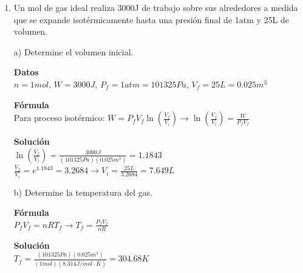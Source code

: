 \documentclass[a4paper, 11pt]{article}
\newcommand{\Pspace}{0.5cm}
\newcommand{\Aspace}{0.2cm}
\begin{document}
\begin{enumerate}
    \vspace{\Pspace}
    \item Un mol de gas ideal realiza 3000J de trabajo sobre sus alrededores a medida que se expande isotérmicamente hasta una presión final de 1atm y 25L de volumen. \par
        \vspace{\Aspace} \par
        a) Determine el volumen inicial.
        \\ { \color{azul} 
            \textbf{Datos} \\
            $n = 1 mol$, $W = 3000 J$, $P_f = 1 atm = 101325 Pa$, $V_f = 25L = 0.025 m^3$ \par

            \textbf{Fórmula} \\
            Para proceso isotérmico: $W = P_f V_f \ln \left( \frac{V_f}{V_i} \right) \rightarrow \ln \left( \frac{V_f}{V_i} \right) = \frac{W}{P_f V_f}$ \par

            \textbf{Solución} \\
            $\ln \left( \frac{V_f}{V_i} \right) = \frac{3000 J}{(101325 Pa)(0.025 m^3)} = 1.1843$ \\
            $\frac{V_f}{V_i} = e^{1.1843} = 3.2684 \rightarrow V_i = \frac{25L}{3.2684} = 7.649 L$
        }

        \vspace{\Aspace} \par
        b) Determine la temperatura del gas.
        \\ { \color{azul} 
            \textbf{Fórmula} \\
            $P_f V_f = nRT_f \rightarrow T_f = \frac{P_f V_f}{nR}$ \par

            \textbf{Solución} \\
            $T_f = \frac{(101325 Pa)(0.025 m^3)}{(1 mol)(8.314 J/mol \cdot K)} = 304.68 K$
        }
    \end{enumerate}
\end{document}
